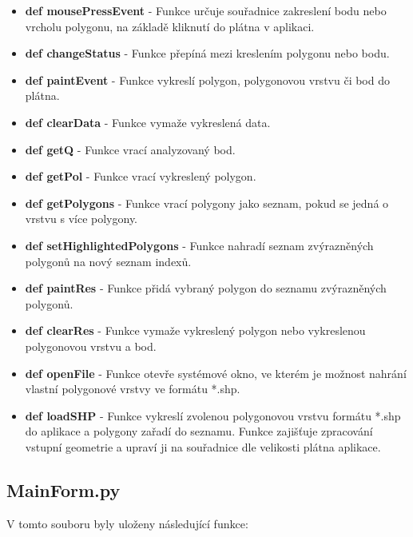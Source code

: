 \documentclass[12pt, a4paper]{article}
\begin{document}
\begin{itemize}
    \item \textbf{def mousePressEvent} - Funkce určuje souřadnice zakreslení bodu nebo vrcholu polygonu, na základě kliknutí do plátna v aplikaci.
    \item \textbf{def changeStatus} - Funkce přepíná mezi kreslením polygonu nebo bodu.
    \item \textbf{def paintEvent} - Funkce vykreslí polygon, polygonovou vrstvu či bod do plátna. 
    \item \textbf{def clearData} - Funkce vymaže vykreslená data.
    \item \textbf{def getQ} - Funkce vrací analyzovaný bod.
    \item \textbf{def getPol} - Funkce vrací vykreslený polygon.
    \item \textbf{def getPolygons} - Funkce vrací polygony jako seznam, pokud se jedná o vrstvu s více polygony.
    \item \textbf{def setHighlightedPolygons} - Funkce nahradí seznam zvýrazněných polygonů na nový seznam indexů.
    \item \textbf{def paintRes} - Funkce přidá vybraný polygon do seznamu zvýrazněných polygonů.
    \item \textbf{def clearRes} - Funkce vymaže vykreslený polygon nebo vykreslenou polygonovou vrstvu a bod.
    \item \textbf{def openFile} - Funkce otevře systémové okno, ve kterém je možnost nahrání vlastní polygonové vrstvy ve formátu *.shp.
    \item \textbf{def loadSHP} - Funkce vykreslí zvolenou polygonovou vrstvu formátu *.shp do aplikace a polygony zařadí do seznamu. Funkce zajišťuje zpracování vstupní geometrie a upraví ji na souřadnice dle velikosti plátna aplikace. 
\end{itemize}

\vspace{5mm}
\subsection*{MainForm.py}
\vspace{3mm}
V tomto souboru byly uloženy následující funkce:
\vspace{3mm}
\end{document}
